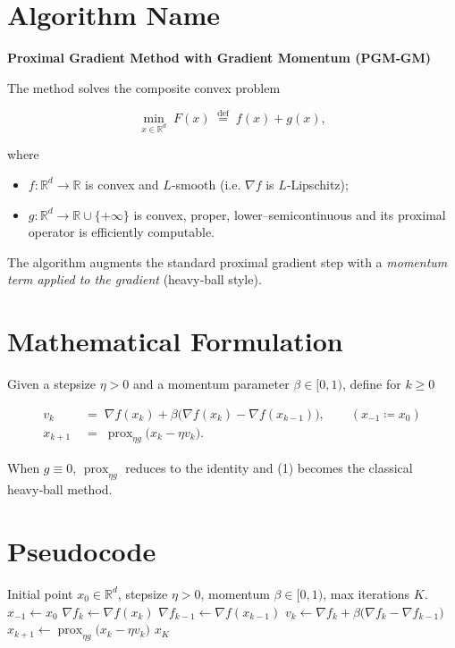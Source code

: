 \documentclass{article}
\newcommand{\prox}{\operatorname{prox}}
\begin{document}
\section*{Algorithm Name}
\textbf{Proximal Gradient Method with Gradient Momentum (PGM‑GM)}  

The method solves the composite convex problem  

\[
\min_{x\in\mathbb{R}^d}\;F(x)\;\stackrel{\text{def}}{=}\;f(x)+g(x),
\]

where  

\begin{itemize}
  \item $f:\mathbb{R}^d\to\mathbb{R}$ is convex and $L$‑smooth (i.e. $\nabla f$ is $L$‑Lipschitz);
  \item $g:\mathbb{R}^d\to\mathbb{R}\cup\{+\infty\}$ is convex, proper, lower–semicontinuous and its proximal operator is efficiently computable.
\end{itemize}

The algorithm augments the standard proximal gradient step with a \emph{momentum term applied to the gradient} (heavy‑ball style).

\section*{Mathematical Formulation}
Given a stepsize $\eta>0$ and a momentum parameter $\beta\in[0,1)$, define for $k\ge 0$

\[
\begin{aligned}
v_k &\;=\;\nabla f(x_k)+\beta\bigl(\nabla f(x_k)-\nabla f(x_{k-1})\bigr),\qquad (x_{-1}\coloneqq x_0)\\[1ex]
x_{k+1} &\;=\;\prox_{\eta g}\!\bigl(x_k-\eta v_k\bigr).
\end{aligned}
\tag{1}
\]

When $g\equiv0$, $\prox_{\eta g}$ reduces to the identity and (1) becomes the classical heavy‑ball method.  

\section*{Pseudocode}
\begin{algorithm}[H]
\caption{PGM‑GM}
\begin{algorithmic}[1]
\Require Initial point $x_0\in\mathbb{R}^d$, stepsize $\eta>0$, momentum $\beta\in[0,1)$, max iterations $K$.
\State $x_{-1}\gets x_0$ 
    \State $\nabla f_k \gets \nabla f(x_k)$
    \State $\nabla f_{k-1} \gets \nabla f(x_{k-1})$ 
    \State $v_k \gets \nabla f_k + \beta\bigl(\nabla f_k-\nabla f_{k-1}\bigr)$
    \State $x_{k+1} \gets \prox_{\eta g}\!\bigl(x_k-\eta v_k\bigr)$
\EndFor
\State \Return $x_K$
\end{algorithmic}
\end{algorithm}
\end{document}
